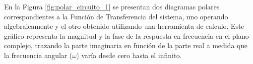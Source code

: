 En la Figura \ref{fig:polar_circuito_1} se presentan dos diagramas polares correspondientes a la Función de
Transferencia del sistema, uno  operando algebraicamente y el otro obtenido utilizando una herramienta de
calculo. Este gráfico representa la magnitud y la fase de la respuesta en frecuencia en el plano complejo, trazando la
parte imaginaria en función de la parte real a medida que la frecuencia angular ($\omega$) varía desde cero hasta el
infinito.

%
%
%

